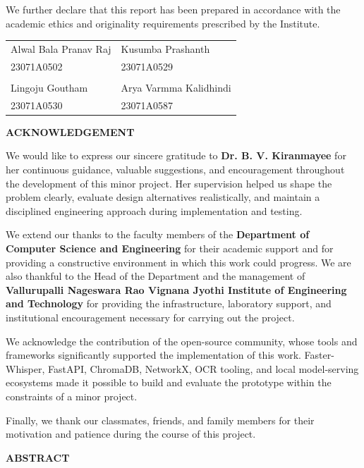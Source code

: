 \documentclass[12pt,a4paper,oneside]{report}
\newcommand{\InstituteName}{Vallurupalli Nageswara Rao Vignana Jyothi Institute of Engineering and Technology}
\newcommand{\DepartmentName}{Department of Computer Science and Engineering}
\newcommand{\GuideName}{Dr. B. V. Kiranmayee}
\begin{document}
We further declare that this report has been prepared in accordance with the academic ethics and originality requirements prescribed by the Institute.

\vspace{1.8cm}
\begin{tabularx}{\textwidth}{X X}
Alwal Bala Pranav Raj & Kusumba Prashanth \\
23071A0502 & 23071A0529 \\
\vspace{1.2cm} & \vspace{1.2cm} \\
Lingoju Goutham & Arya Varmma Kalidhindi \\
23071A0530 & 23071A0587 \\
\end{tabularx}

\clearpage
\begin{center}
{\Large \textbf{ACKNOWLEDGEMENT}}
\end{center}

We would like to express our sincere gratitude to \textbf{\GuideName} for her continuous guidance, valuable suggestions, and encouragement throughout the development of this minor project. Her supervision helped us shape the problem clearly, evaluate design alternatives realistically, and maintain a disciplined engineering approach during implementation and testing.

We extend our thanks to the faculty members of the \textbf{\DepartmentName} for their academic support and for providing a constructive environment in which this work could progress. We are also thankful to the Head of the Department and the management of \textbf{\InstituteName} for providing the infrastructure, laboratory support, and institutional encouragement necessary for carrying out the project.

We acknowledge the contribution of the open-source community, whose tools and frameworks significantly supported the implementation of this work. Faster-Whisper, FastAPI, ChromaDB, NetworkX, OCR tooling, and local model-serving ecosystems made it possible to build and evaluate the prototype within the constraints of a minor project.

Finally, we thank our classmates, friends, and family members for their motivation and patience during the course of this project.

\clearpage
\begin{center}
{\Large \textbf{ABSTRACT}}
\end{center}
\end{document}
